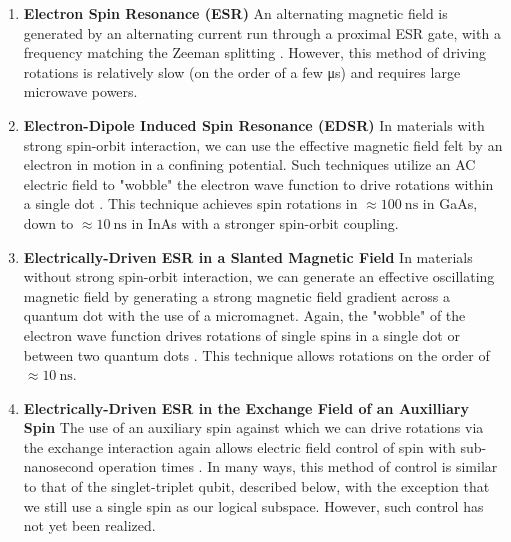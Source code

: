 \begin{enumerate}
  \item \textbf{Electron Spin Resonance (ESR)} An alternating magnetic field is generated by an alternating current run through a proximal ESR gate,
        with a frequency matching the Zeeman splitting \cite{nnano.2014.216}. However, this method of driving rotations is relatively
        slow (on the order of a few \si{\micro\second}) and requires large microwave powers.
  \item \textbf{Electron-Dipole Induced Spin Resonance (EDSR)} In materials with strong spin-orbit interaction, we can
        use the effective magnetic field felt by an electron in motion in a confining potential. Such techniques utilize an AC electric
        field to "wobble" the electron wave function to drive rotations within a single dot \cite{Nowack1430,nature11559}. This technique
        achieves spin rotations in $\approx \SI{100}{\nano\second}$ in GaAs, down to $\approx \SI{10}{\nano\second}$ in InAs with a stronger spin-orbit coupling.
  \item \textbf{Electrically-Driven ESR in a Slanted Magnetic Field} In materials without strong spin-orbit interaction,
        we can generate an effective oscillating magnetic field by generating a strong magnetic field gradient across a quantum dot with the use of a micromagnet.
        Again, the "wobble" of the electron wave function drives rotations of single spins in a single dot \cite{PhysRevLett.107.146801}
        or between two quantum dots \cite{2019arXiv190500346C}. This technique allows rotations on the order of $\approx \SI{10}{\nano\second}$.
  \item \textbf{Electrically-Driven ESR in the Exchange Field of an Auxilliary Spin} The use of an auxiliary spin against
        which we can drive rotations via the exchange interaction again  allows electric field control of spin with sub-nanosecond operation times \cite{PhysRevB.90.235311}.
        In many ways, this method of control is similar to that of the singlet-triplet qubit, described below, with the exception that we still use a single
        spin as our logical subspace. However, such control has not yet been realized.
\end{enumerate}


